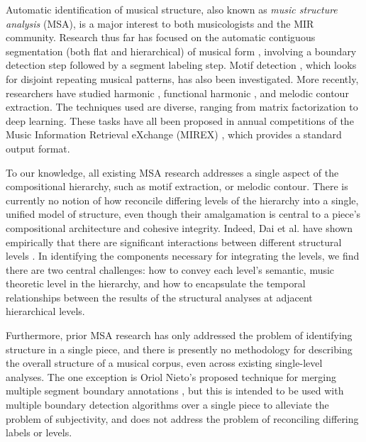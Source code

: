\documentclass{article}
\begin{document}
Automatic identification of musical structure, also known as \textit{music structure analysis} (MSA), is a major interest to both musicologists and the MIR community. Research thus far has focused on the automatic contiguous segmentation (both flat and hierarchical) of musical form \cite{msaf, checkerboard, sf, vmo_segmentation, cnmf, 2dfmc, eval_hier, olda, scluster, musicaiz, repetition_grammars_ismir2023, buisson_2022, cmu_dannenberg_2020}, involving a boundary detection step followed by a segment labeling step. Motif detection \cite{Hsiao_2023_motifs, vmo_motifs, features_motifs}, which looks for disjoint repeating musical patterns, has also been investigated. More recently, researchers have studied harmonic \cite{chen_2019_harmony}, functional harmonic \cite{chen_2018_harmony}, and melodic \cite{salamon_2013_melody, kosta_22_melody, midibert} contour extraction. The techniques used are diverse, ranging from matrix factorization to deep learning. These tasks have all been proposed in annual competitions of the Music Information Retrieval eXchange (MIREX) \cite{MIREX_2017_form, MIREX_2017_motif, MIREX_2010_harmony, MIREX_2021_melody}, which provides a standard output format. 

To our knowledge, all existing MSA research addresses a single aspect of the compositional hierarchy, such as motif extraction, or melodic contour. There is currently no notion of how reconcile differing levels of the hierarchy into a single, unified model of  structure, even though their amalgamation is central to a piece's compositional architecture and cohesive integrity. Indeed, Dai et al. have shown empirically that there are significant interactions between different structural levels \cite{cmu_dannenberg_2020}. In identifying the components necessary for integrating the levels, we find there are two central challenges: how to convey each level's semantic, music theoretic level in the hierarchy, and how to encapsulate the temporal relationships between the results of the structural analyses at adjacent hierarchical levels. 

Furthermore, prior MSA research has only addressed the problem of identifying structure in a single piece, and there is presently no methodology for describing the overall structure of a musical corpus, even across existing single-level analyses. The one exception is Oriol Nieto's proposed technique for merging multiple segment boundary annotations \cite{msaf}, but this is intended to be used with multiple boundary detection algorithms over a single piece to alleviate the problem of subjectivity, and does not address the problem of reconciling differing labels or levels.  
\end{document}
